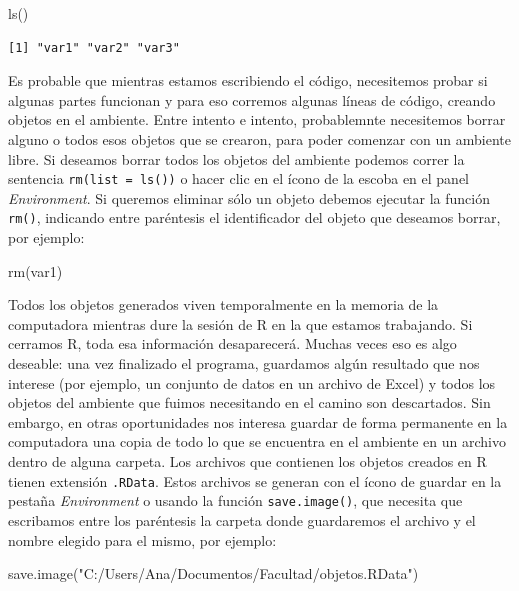 \documentclass[
]{book}
\newenvironment{Shaded}{\begin{snugshade}}{\end{snugshade}}
\newcommand{\FunctionTok}[1]{\textcolor[rgb]{0.00,0.00,0.00}{#1}}
\newcommand{\NormalTok}[1]{#1}
\newcommand{\StringTok}[1]{\textcolor[rgb]{0.31,0.60,0.02}{#1}}
\begin{document}
\begin{Shaded}
\begin{Highlighting}[]
\FunctionTok{ls}\NormalTok{()}
\end{Highlighting}
\end{Shaded}

\begin{verbatim}
[1] "var1" "var2" "var3"
\end{verbatim}

Es probable que mientras estamos escribiendo el código, necesitemos probar si algunas partes funcionan y para eso corremos algunas líneas de código, creando objetos en el ambiente. Entre intento e intento, probablemnte necesitemos borrar alguno o todos esos objetos que se crearon, para poder comenzar con un ambiente libre. Si deseamos borrar todos los objetos del ambiente podemos correr la sentencia \texttt{rm(list\ =\ ls())} o hacer clic en el ícono de la escoba en el panel \emph{Environment}. Si queremos eliminar sólo un objeto debemos ejecutar la función \texttt{rm()}, indicando entre paréntesis el identificador del objeto que deseamos borrar, por ejemplo:

\begin{Shaded}
\begin{Highlighting}[]
\FunctionTok{rm}\NormalTok{(var1)}
\end{Highlighting}
\end{Shaded}

Todos los objetos generados viven temporalmente en la memoria de la computadora mientras dure la sesión de R en la que estamos trabajando. Si cerramos R, toda esa información desaparecerá. Muchas veces eso es algo deseable: una vez finalizado el programa, guardamos algún resultado que nos interese (por ejemplo, un conjunto de datos en un archivo de Excel) y todos los objetos del ambiente que fuimos necesitando en el camino son descartados. Sin embargo, en otras oportunidades nos interesa guardar de forma permanente en la computadora una copia de todo lo que se encuentra en el ambiente en un archivo dentro de alguna carpeta. Los archivos que contienen los objetos creados en R tienen extensión \texttt{.RData}. Estos archivos se generan con el ícono de guardar en la pestaña \emph{Environment} o usando la función \texttt{save.image()}, que necesita que escribamos entre los paréntesis la carpeta donde guardaremos el archivo y el nombre elegido para el mismo, por ejemplo:

\begin{Shaded}
\begin{Highlighting}[]
\FunctionTok{save.image}\NormalTok{(}\StringTok{"C:/Users/Ana/Documentos/Facultad/objetos.RData"}\NormalTok{)}
\end{Highlighting}
\end{Shaded}
\end{document}

